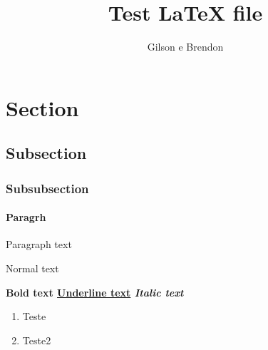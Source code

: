 \documentclass[12pt]{article}
\title{Test LaTeX file}
\author{Gilson e Brendon}
\begin{document}
\maketitle

\section{Section}
\subsection{Subsection}
\subsubsection{Subsubsection}
\paragraph{Paragrh} Paragraph text 

Normal text

\bf{Bold text}
\underline{Underline text}
\it{Italic text}

\begin{enumerate}
\item Teste
\item Teste2
\end{enumerate}
\end{document}
